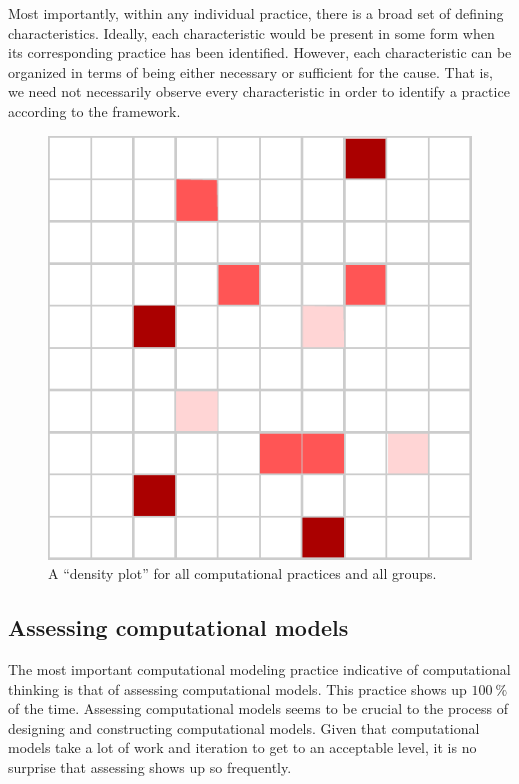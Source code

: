 \documentclass{msuphddissertation}
\begin{document}
\begin{doublespace}
Most importantly, within any individual practice, there is a broad set of defining characteristics.  Ideally, each characteristic would be present in some form when its corresponding practice has been identified.  However, each characteristic can be organized in terms of being either necessary or sufficient for the cause.  That is, we need not necessarily observe every characteristic in order to identify a practice according to the framework.

\begin{figure}[ht]\centering
\includegraphics[scale=1]{./images/matrix.pdf}
\caption{A ``density plot'' for all computational practices and all groups.}
\end{figure}

\subsection{Assessing computational models}

The most important computational modeling practice indicative of computational thinking is that of assessing computational models.  This practice shows up $\SI{100}{\percent}$ of the time.  Assessing computational models seems to be crucial to the process of designing and constructing computational models.  Given that computational models take a lot of work and iteration to get to an acceptable level, it is no surprise that assessing shows up so frequently.


\end{doublespace}
\end{document}
